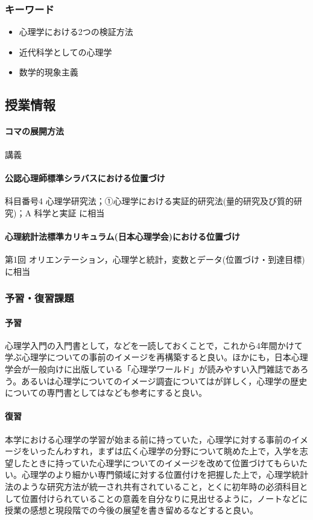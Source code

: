 \subsubsection{キーワード}
\begin{itemize}
	\item 心理学における2つの検証方法
	\item 近代科学としての心理学
	\item 数学的現象主義
\end{itemize}
\subsection{授業情報}
\paragraph{コマの展開方法}
講義
\paragraph{公認心理師標準シラバスにおける位置づけ}
科目番号4 心理学研究法；①心理学における実証的研究法(量的研究及び質的研究)；A 科学と実証 に相当
\paragraph{心理統計法標準カリキュラム(日本心理学会)における位置づけ}
第1回 オリエンテーション，心理学と統計，変数とデータ(位置づけ・到達目標) に相当
\subsubsection{予習・復習課題}
\paragraph{予習}
心理学入門の入門書として，\textcite{Daihiko201507,Michimata200903}などを一読しておくことで，これから4年間かけて学ぶ心理学についての事前のイメージを再構築すると良い。ほかにも，日本心理学会が一般向けに出版している「心理学ワールド」が読みやすい入門雑誌であろう。あるいは心理学についてのイメージ調査については\textcite{Kikuchi2018}が詳しく，心理学の歴史についての専門書としては\textcite{Ohashi201610}なども参考にすると良い。
\paragraph{復習}
本学における心理学の学習が始まる前に持っていた，心理学に対する事前のイメージをいったんわすれ，まずは広く心理学の分野について眺めた上で，入学を志望したときに持っていた心理学についてのイメージを改めて位置づけてもらいたい。心理学のより細かい専門領域に対する位置付けを把握した上で，心理学統計法のような研究方法が統一され共有されていること，とくに初年時の必須科目として位置付けられていることの意義を自分なりに見出せるように，ノートなどに授業の感想と現段階での今後の展望を書き留めるなどすると良い。
